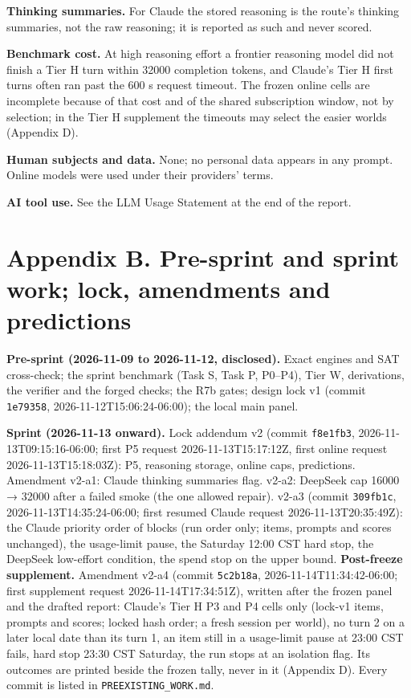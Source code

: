 \documentclass[
  10pt,
]{article}
\begin{document}
\textbf{Thinking summaries.} For Claude the stored reasoning is the
route's thinking summaries, not the raw reasoning; it is reported as
such and never scored.

\textbf{Benchmark cost.} At high reasoning effort a frontier reasoning
model did not finish a Tier H turn within 32000 completion tokens, and
Claude's Tier H first turns often ran past the 600 s request timeout.
The frozen online cells are incomplete because of that cost and of the
shared subscription window, not by selection; in the Tier H supplement
the timeouts may select the easier worlds (Appendix D).

\textbf{Human subjects and data.} None; no personal data appears in any
prompt. Online models were used under their providers' terms.

\textbf{AI tool use.} See the LLM Usage Statement at the end of the
report.

\section{Appendix B. Pre-sprint and sprint work; lock, amendments and
predictions}\label{appendix-b.-pre-sprint-and-sprint-work-lock-amendments-and-predictions}

\textbf{Pre-sprint (2026-11-09 to 2026-11-12, disclosed).} Exact engines
and SAT cross-check; the sprint benchmark (Task S, Task P, P0--P4), Tier
W, derivations, the verifier and the forged checks; the R7b gates;
design lock v1 (commit \texttt{1e79358}, 2026-11-12T15:06:24-06:00); the
local main panel.

\textbf{Sprint (2026-11-13 onward).} Lock addendum v2 (commit
\texttt{f8e1fb3}, 2026-11-13T09:15:16-06:00; first P5 request
2026-11-13T15:17:12Z, first online request 2026-11-13T15:18:03Z): P5,
reasoning storage, online caps, predictions. Amendment v2-a1: Claude
thinking summaries flag. v2-a2: DeepSeek cap 16000 → 32000 after a
failed smoke (the one allowed repair). v2-a3 (commit \texttt{309fb1c},
2026-11-13T14:35:24-06:00; first resumed Claude request
2026-11-13T20:35:49Z): the Claude priority order of blocks (run order
only; items, prompts and scores unchanged), the usage-limit pause, the
Saturday 12:00 CST hard stop, the DeepSeek low-effort condition, the
spend stop on the upper bound. \textbf{Post-freeze supplement.}
Amendment v2-a4 (commit \texttt{5c2b18a}, 2026-11-14T11:34:42-06:00;
first supplement request 2026-11-14T17:34:51Z), written after the frozen
panel and the drafted report: Claude's Tier H P3 and P4 cells only
(lock-v1 items, prompts and scores; locked hash order; a fresh session
per world), no turn 2 on a later local date than its turn 1, an item
still in a usage-limit pause at 23:00 CST fails, hard stop 23:30 CST
Saturday, the run stops at an isolation flag. Its outcomes are printed
beside the frozen tally, never in it (Appendix D). Every commit is
listed in \texttt{PREEXISTING\_WORK.md}.
\end{document}
